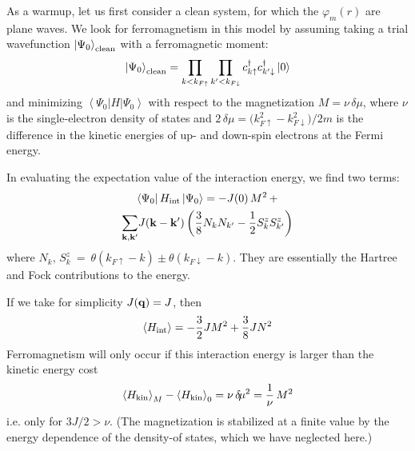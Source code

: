 \documentclass[prb,twocolumn]{revtex4}
\begin{document}
As a warmup, let us first consider a clean system, for which the
${\varphi_m}(r)$ are plane waves. We look for ferromagnetism in this
model by assuming taking a trial wavefunction $\left|\Psi_0\right\rangle_{\rm clean}$
with a ferromagnetic moment:
\begin{equation}
\left|{\Psi_0}\right\rangle_{\rm clean} =
\prod_{k<k_{F\uparrow}}\prod_{k'<k_{F\downarrow}}
{c^\dagger_{k\uparrow}}{c^\dagger_{k'\downarrow}}
\left|0\right\rangle
\end{equation}
and minimizing $\left\langle{\Psi_0}\right| H \left|{\Psi_0}\right\rangle$
with respect to the magnetization $M= \nu\,\delta\!\mu$,
where $\nu$ is the single-electron density of states and
$2\,\delta\!\mu=\bigl(k^2_{F\uparrow}-k^2_{F\downarrow}\bigr)/2m$
is the difference in the kinetic energies of up- and down-spin
electrons at the Fermi energy.

In evaluating the expectation value of the interaction energy,
we find two terms:
\begin{multline}
\left\langle{\Psi_0}\right| H_{\rm int} \left|{\Psi_0}\right\rangle =
-J\!\left(0\right) {M^2}\,+\\
{\sum_{\bf k,k'}}J\!\left({\bf k}-{\bf k'}\right)
\left(\frac{3}{8}{N_k}{N_{k'}}-\frac{1}{2}{S^z_k}{S^z_{k'}}\right)
\end{multline}
where ${N_k} , \, {S^z_k} \: = \: \theta(k_{F\uparrow}-k)\pm\theta(k_{F\downarrow}-k)$.
They are essentially the Hartree and Fock contributions to the energy.

If we take for simplicity $J\!\left({\bf q}\right)=J$, then
\begin{equation}
\label{eqn:pot-energy-clean}
\left\langle H_{\rm int}  \right\rangle = -\frac{3}{2}J{M^2}+\frac{3}{8}J{N^2}
\end{equation}
Ferromagnetism will only occur if this interaction energy
is larger than the kinetic energy cost
\begin{equation}
\left\langle H_{\rm kin}  \right\rangle_{M} - \left\langle H_{\rm kin}  \right\rangle_{0}
= \nu \, {\delta\!\mu^2} = \frac{1}{\nu}\,{M^2}
\end{equation}
i.e. only for $3J/2>\nu$. (The magnetization is stabilized at a finite
value by the energy dependence of the density-of states, which we have
neglected here.)
\end{document}
